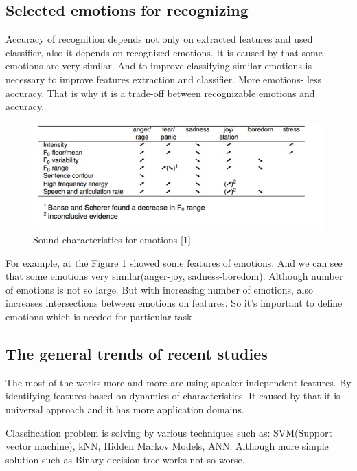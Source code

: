 \documentclass[14pt]{extarticle}
\begin{document}
\subsection{Selected emotions for recognizing}
Accuracy of recognition depends not only on extracted features and used classifier, also it depends on recognized emotions. It is caused by that some emotions are very similar. And to improve classifying similar emotions is necessary to improve features extraction and classifier. More emotions- less accuracy. That is why it is a trade-off between recognizable emotions and accuracy.
\begin{figure}[t]
	\centering
	\includegraphics[scale=0.8]{emotion-table-example}
	\caption{Sound characteristics for emotions [1]}
	\label{fig:emotion-table-example}
\end{figure}

For example, at the Figure 1 showed some features of emotions. And we can see that some emotions very similar(anger-joy, sadness-boredom). Although number of emotions is not so large. But with increasing number of emotions, also increases intersections between emotions on features. So it's important to define emotions which is needed for particular task
\subsection{The general trends of recent studies}
The most of the works more and more are using speaker-independent features. By identifying features based on dynamics of characteristics. It caused by that it is universal approach and it has more application domains.

Classification problem is solving by various techniques such as: SVM(Support vector machine), kNN, Hidden Markov Models, ANN. Although more simple solution such as Binary decision tree works not so worse.
\end{document}
